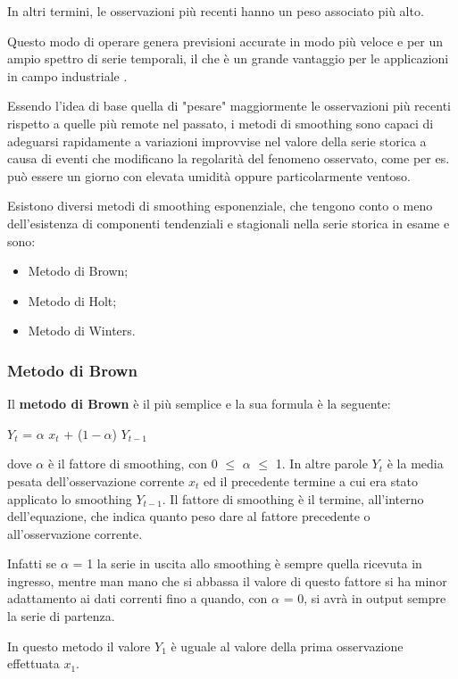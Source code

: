 \documentclass[12pt,a4paper,oneside,openright]{book}
\begin{document}
In altri termini, le osservazioni più recenti hanno un peso associato più alto. 

Questo modo di operare genera previsioni accurate in modo più veloce e per un ampio spettro di serie temporali, il che è un grande vantaggio per le applicazioni in campo industriale \cite{7a}.

Essendo l'idea di base quella di "pesare" maggiormente le osservazioni più recenti rispetto a quelle più remote nel passato, i metodi di smoothing sono capaci di adeguarsi rapidamente a variazioni improvvise nel valore della serie storica a causa di eventi che modificano la regolarità del fenomeno osservato, come per es. può essere un giorno con elevata umidità oppure particolarmente ventoso. 

Esistono diversi metodi di smoothing esponenziale, che tengono conto o meno dell'esistenza di componenti tendenziali e stagionali nella serie storica in esame e sono:
\begin{itemize}
\item Metodo di Brown;
\item Metodo di Holt;
\item Metodo di Winters.
\end{itemize}

\subsubsection{Metodo di Brown}
Il {\bfseries metodo di Brown} è il più semplice e la sua formula è la seguente:
\begin{center}
$Y_{t}$ = $\alpha$ $x_{t}$ + (${1 - \alpha }$) $Y_{t-1}$
\end{center}

dove $\alpha$ è il fattore di smoothing, con 0 $\leq$ $\alpha$  $\leq$ 1. In altre parole $Y_{t}$ è la media pesata dell'osservazione corrente $x_{t}$ ed il precedente termine a cui era stato applicato lo smoothing $Y_{t-1}$. Il fattore di smoothing è il termine, all'interno dell'equazione, che indica quanto peso dare al fattore precedente o all'osservazione corrente. 

Infatti se $\alpha$ = 1 la serie in uscita allo smoothing è sempre quella ricevuta in ingresso, mentre man mano che si abbassa il valore di questo fattore si ha minor adattamento ai dati correnti fino a quando, con $\alpha$ = 0, si avrà in output sempre la serie di partenza.

In questo metodo il valore $Y_{1}$ è uguale al valore della prima osservazione effettuata $x_{1}$.
\end{document}
